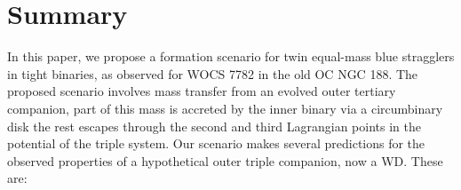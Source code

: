\documentclass[twocolumn]{aastex62}
\begin{document}

\section{Summary} \label{sect:conclusions}

In this paper, we propose a formation scenario for twin equal-mass
blue stragglers in tight binaries, as observed for WOCS 7782 in the
old OC NGC 188.  The proposed scenario involves mass transfer from an
evolved outer tertiary companion, part of this mass is accreted by the
inner binary via a circumbinary disk the rest escapes through the
second and third Lagrangian points in the potential of the triple
system.  Our scenario makes several predictions for the observed
properties of a hypothetical outer triple companion, now a WD.  These
are:
\end{document}
